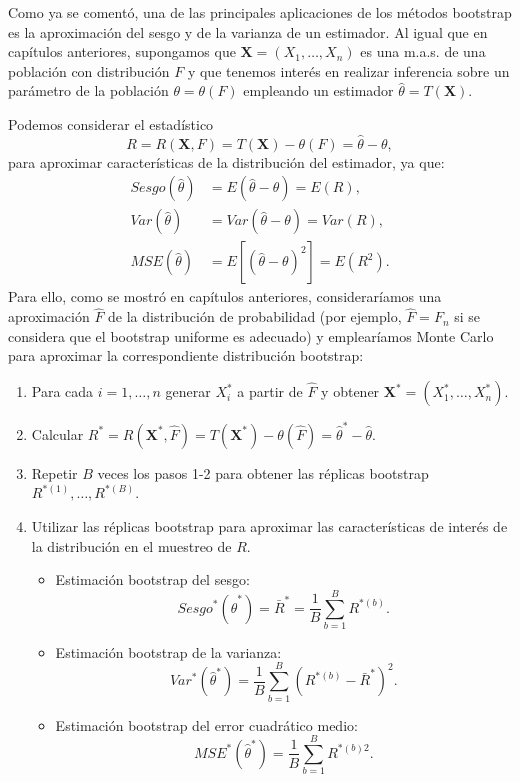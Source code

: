 \documentclass[
  spanish,
  10pt,
]{book}
\renewcommand{\mathbf}[1]{\symbf{#1}}
\theoremstyle{break}
\theoremstyle{nonumberplain}
\begin{document}
Como ya se comentó, una de las principales aplicaciones de los métodos bootstrap es la aproximación del sesgo y de la varianza de un estimador.
Al igual que en capítulos anteriores, supongamos que \(\mathbf{X}=\left( X_1,\ldots ,X_n \right)\) es una m.a.s. de una población con distribución \(F\) y que tenemos interés en realizar inferencia sobre un parámetro de la población \(\theta =\theta \left( F \right)\) empleando un estimador \(\hat{\theta}=T\left( \mathbf{X} \right)\).

Podemos considerar el estadístico
\[R=R\left( \mathbf{X}, F \right) = T\left( \mathbf{X} \right) - \theta \left( F \right) = \hat{\theta} - \theta,\]
para aproximar características de la distribución del estimador, ya que:
\[\begin{aligned}
Sesgo\left( \hat{\theta} \right) &= E\left( \hat{\theta}-\theta \right)
=E\left( R \right), \\
Var\left( \hat{\theta} \right) &= Var\left( \hat{\theta}-\theta \right)
=Var\left( R \right), \\
MSE\left( \hat{\theta} \right) &= E\left[ \left( \hat{\theta}-\theta \right)
^2\right] =E\left( R^2 \right).
\end{aligned}\]
Para ello, como se mostró en capítulos anteriores, consideraríamos una aproximación \(\hat{F}\) de la distribución de probabilidad (por ejemplo, \(\hat{F}=F_n\) si se considera que el bootstrap uniforme es adecuado) y emplearíamos Monte Carlo para aproximar la correspondiente distribución bootstrap:

\begin{enumerate}
\def\labelenumi{\arabic{enumi}.}
\item
  Para cada \(i=1,\ldots ,n\) generar \(X_i^{\ast}\) a partir de
  \(\hat{F}\) y obtener \(\mathbf{X}^{\ast}=\left( X_1^{\ast}, \ldots ,X_n^{\ast} \right)\).
\item
  Calcular \(R^{\ast}=R\left( \mathbf{X}^{\ast},\hat{F} \right)
  = T\left( \mathbf{X}^{\ast} \right) -\theta \left( \hat{F} \right) =
  \hat{\theta}^{\ast} - \hat{\theta}\).
\item
  Repetir \(B\) veces los pasos 1-2 para obtener las réplicas bootstrap
  \(R^{\ast (1)}, \ldots, R^{\ast (B)}\).
\item
  Utilizar las réplicas bootstrap para aproximar las características de interés de la distribución en el muestreo de \(R\).

  \begin{itemize}
  \item
    Estimación bootstrap del sesgo:
    \[Sesgo^{\ast}\left( \hat{\theta}^{\ast} \right) =\bar{R}^{\ast}=\frac{1}{B}\sum_{b=1}^{B}R^{\ast (b)}.\]
  \item
    Estimación bootstrap de la varianza:
    \[Var^{\ast}\left( \hat{\theta}^{\ast} \right) =\frac{1}{B} \sum_{b=1}^{B}\left( R^{\ast (b)}-\bar{R}^{\ast} \right)^2.\]
  \item
    Estimación bootstrap del error cuadrático medio:
    \[MSE^{\ast}\left( \hat{\theta}^{\ast} \right) =\frac{1}{B}\sum_{b=1}^{B}R^{\ast (b) 2}.\]
  \end{itemize}
\end{enumerate}
\end{document}
